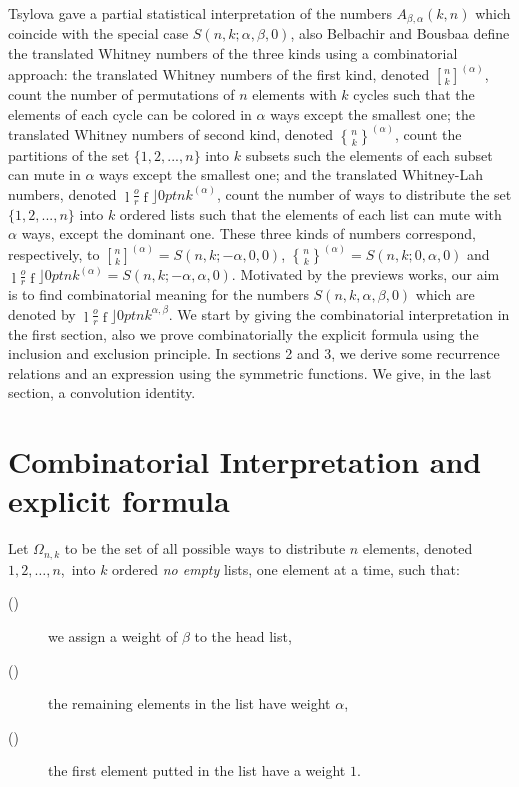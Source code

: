 \documentclass{article}
\newcommand {\stirlingf}[2]{\genfrac[]{0pt}{}{#1}{#2}}
\newcommand {\stirlings}[2]{\genfrac\{\}{0pt}{}{#1}{#2}}
\newcommand {\lah}[2]{\genfrac\lfloor \rfloor{0pt}{}{#1}{#2}}
\begin{document}
Tsylova \cite{Tsy4285} gave a partial statistical interpretation of the numbers $%
A_{\beta ,\alpha }\left( k,n\right) $ which coincide with the special case $%
S\left( n,k;\alpha ,\beta ,0\right) $, also Belbachir and Bousbaa \cite{MR25}
define the translated Whitney numbers of the three kinds using a
combinatorial approach: the translated Whitney numbers of the first kind,
denoted $\stirlingf{n}{k}^{(\alpha )}$, count the number of
permutations of $n$ elements with $k$ cycles such that the elements of each
cycle can be colored in $\alpha $ ways except the smallest one; the
translated Whitney numbers of second kind, denoted $\stirlings{n}{k}^{(\alpha )}$,
count the partitions of the set $\{1,2,...,n\}$ into $k$
subsets such the elements of each subset can mute in $\alpha $ ways except
the smallest one; and the translated Whitney-Lah numbers, denoted $%
\lah{n}{k}^{(\alpha )}$, count the number of ways to
distribute the set $\{1,2,...,n\}$ into $k$ ordered lists such that the
elements of each list can mute with $\alpha $ ways, except the dominant one.
These three kinds of numbers correspond, respectively, to $\stirlingf{n}{k}%
^{(\alpha )}=S(n,k;-\alpha ,0,0)$, $\stirlings{n}{k}^{(\alpha
)}=S(n,k;0,\alpha ,0)$ and $\lah{n}{k}^{(\alpha
)}=S(n,k;-\alpha ,\alpha ,0)$. Motivated by the previews works, our aim is
to find combinatorial meaning for the numbers $S\left( n,k,\alpha
,\beta ,0\right) $ which are denoted by $\lah{n}{k}^{\alpha ,\beta }$. We start by giving the combinatorial
interpretation in the first section, also we prove combinatorially the
explicit formula using the inclusion and exclusion principle. In sections 2
and 3, we derive some recurrence relations and an expression using the
symmetric functions. We give, in the last section, a convolution identity.

\section{Combinatorial Interpretation and explicit formula}
Let $\Omega _{n,k}$ to be the set of all possible ways to distribute $n$
elements, denoted $1,2,\ldots ,n$,\ into $k$ ordered \textit{no empty}
lists, one element at a time, such that:

\begin{description}
  \item[({})]  we assign a weight of $\beta $ to the head list,
  \item[({})]  the remaining elements in the list have weight $\alpha$,
  \item[({})]  the first element putted in the list have a weight $1$.
\end{description}
\end{document}
